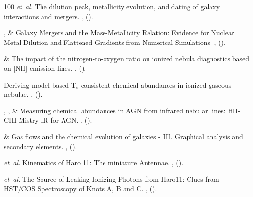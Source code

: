 \documentclass{nature2}
\begin{document}
\begin{thebibliography}{100}
 \emph{et~al.}
\newblock The dilution peak, metallicity evolution, and dating of galaxy interactions and mergers.
\newblock \emph{} \textbf{},
 ().

,  \& 
\newblock Galaxy Mergers and the Mass-Metallicity Relation: Evidence for Nuclear Metal Dilution and Flattened Gradients from Numerical Simulations.
\newblock \emph{} \textbf{},
 ().

 \&
\newblock The impact of the nitrogen-to-oxygen ratio on ionized nebula diagnostics based on [NII] emission lines.
\newblock \emph{} \textbf{},
 ().

\newblock Deriving model-based T\ensuremath{_{e}}-consistent chemical abundances in ionized gaseous nebulae.
\newblock \emph{} \textbf{},
 ().

, 
,
 \&
\newblock Measuring chemical abundances in AGN from infrared nebular lines: HII-CHI-Mistry-IR for AGN.
\newblock \emph{} \textbf{},
 ().

 \&
\newblock Gas flows and the chemical evolution of galaxies - III. Graphical analysis and secondary elements.
\newblock \emph{} \textbf{},
 ().

 \emph{et~al.}
\newblock Kinematics of Haro 11: The miniature Antennae.
\newblock \emph{} \textbf{},
 ().

 \emph{et~al.}
\newblock The Source of Leaking Ionizing Photons from Haro11: Clues from HST/COS Spectroscopy of Knots A, B and C.
\newblock \emph{} \textbf{},
 ().


\end{thebibliography}
\end{document}
